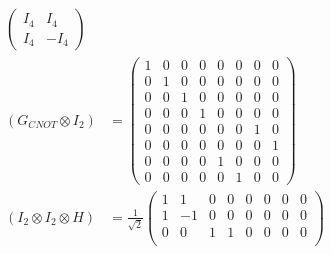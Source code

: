 \documentclass[10pt]{article}
\theoremstyle{definition}
\begin{document}
\begin{align*}
\begin{pmatrix}
                                                                                                     I_4 & I_4  \\
                                                                                                     I_4 & -I_4
                                                                                                   \end{pmatrix}                    \\
  (G_{CNOT}\otimes I_2)                                                       & =\begin{pmatrix}
                                                                                   1 & 0 & 0 & 0 & 0 & 0 & 0 & 0 \\
                                                                                   0 & 1 & 0 & 0 & 0 & 0 & 0 & 0 \\
                                                                                   0 & 0 & 1 & 0 & 0 & 0 & 0 & 0 \\
                                                                                   0 & 0 & 0 & 1 & 0 & 0 & 0 & 0 \\
                                                                                   0 & 0 & 0 & 0 & 0 & 0 & 1 & 0 \\
                                                                                   0 & 0 & 0 & 0 & 0 & 0 & 0 & 1 \\
                                                                                   0 & 0 & 0 & 0 & 1 & 0 & 0 & 0 \\
                                                                                   0 & 0 & 0 & 0 & 0 & 1 & 0 & 0
                                                                                 \end{pmatrix}                       \\
  (I_2 \otimes I_2\otimes H)                                                  & =\frac{1}{\sqrt{2}}\begin{pmatrix}
                                                                                                     1 & 1  & 0 & 0  & 0 & 0  & 0 & 0  \\
                                                                                                     1 & -1 & 0 & 0  & 0 & 0  & 0 & 0  \\
                                                                                                     0 & 0  & 1 & 1  & 0 & 0  & 0 & 0  \\

\end{pmatrix}
\end{align*}
\end{document}
